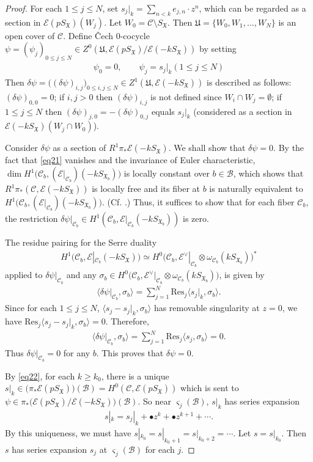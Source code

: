 \documentclass[12pt,a4paper,notitlepage]{article}
\theoremstyle{definition}
\theoremstyle{plain}
\newcommand{\fk}{\mathfrak}
\newcommand{\mc}{\mathcal}
\newcommand{\Res}{\mathrm{Res}}
\newcommand{\bk}[1]{\langle {#1}\rangle}
\newcommand{\scr}{\mathscr}
\newcommand{\sgm}{\varsigma}
\newcommand{\SX}{{S_{\fk X}}}
\numberwithin{equation}{section}
\begin{document}
\begin{proof}
For each $1\leq j\leq N$, set $s_j|_k=\sum_{n<k}e_{j,n}\cdot z^n$, which can be regarded as a section in $\scr E(p\SX)(W_j)$. Let $W_0=\mc C\setminus\SX$. Then $\fk U=\{W_0,W_1,\dots,W_N \}$ is an open cover of $\mc C$. Define \v{C}ech $0$-cocycle $\psi=(\psi_j)_{0\leq j\leq N}\in Z^0(\fk U,\scr E(p\SX)/\scr E(-k\SX))$ by setting
\begin{align*}
\psi_0=0,\qquad\psi_j=s_j|_k (1\leq j\leq N)
\end{align*}
Then $\delta\psi=\big((\delta\psi)_{i,j}\big)_{0\leq i,j\leq N}\in Z^1(\fk U,\scr E(-k\SX))$ is described as follows: $(\delta\psi)_{0,0}=0$; if $i,j>0$ then $(\delta\psi)_{i,j}$ is not defined since $W_i\cap W_j=\emptyset$; if $1\leq j\leq N$ then $(\delta\psi)_{j,0}=-(\delta\psi)_{0,j}$ equals $s_j|_k$ (considered as a section in $\scr E(-k\SX)(W_j\cap W_0)$).
	
Consider $\delta\psi$ as a section of $R^1\pi_*\scr E(-k\SX)$. We shall show that $\delta\psi=0$.  By the fact that \eqref{eq21} vanishes and the invariance of Euler characteristic,  $\dim H^1\big(\mc C_b,(\scr E|_{\mc C_b})(-kS_{\fk X_b})\big)$ is locally constant over $b\in\mc B$, which shows  that $R^1\pi_*(\mc C,\scr E(-k\SX))$ is locally free and its fiber at $b$ is naturally equivalent to $H^1\big(\mc C_b,(\scr E|_{\mc C_b})(-kS_{\fk X_b})\big)$. (Cf. \cite[Thm. III.4.12]{BS76}.) Thus, it suffices to show that for each fiber $\mc C_b$, the restriction $\delta\psi|_{\mc C_b}\in H^1(\mc C_b,\scr E|_{\mc C_b}(-k S_{\fk X_b}))$ is zero.

The residue pairing for the Serre duality
\begin{align*}
H^1(\mc C_b,\scr E|_{\mc C_b}(-k\SX))\simeq H^0\big(\mc C_b,\scr E^\vee|_{\mc C_b}\otimes\omega_{\mc C_b}(kS_{\fk X_b})\big)^*
\end{align*}
applied to $\delta\psi|_{\mc C_b}$ and any $\sigma_b\in H^0\big(\mc C_b,\scr E^\vee|_{\mc C_b}\otimes\omega_{\mc C_b}(kS_{\fk X_b})\big)$, is given by
\begin{align*}
\bk{\delta\psi|_{\mc C_b},\sigma_b}=\sum_{j=1}^N\Res_j\bk{s_j|_k,\sigma_b}.
\end{align*}
Since for each $1\leq j\leq N$, $\bk{s_j-s_j|_k,\sigma_b}$ has removable singularity at $z=0$, we have $\Res_j\bk{s_j-s_j|_k,\sigma_b}=0$. Therefore, 
\begin{align*}
\bk{\delta\psi|_{\mc C_b},\sigma_b}=\sum_{j=1}^N\Res_j\bk{s_j,\sigma_b}=0.
\end{align*}
Thus $\delta\psi|_{\mc C_b}=0$ for any $b$.  This proves that $\delta\psi=0$. 
	
By \eqref{eq22}, for each $k\geq k_0$, there is a unique $s|_k\in\big(\pi_*\scr E(p\SX)\big)(\mc B)= H^0(\mc C,\scr E(p\SX))$ which is sent to $\psi\in \pi_*\big(\scr E(p\SX)/\scr E(-k\SX)\big)(\mc B)$. So near $\sgm_j(\mc B)$, $s|_k$ has series expansion
\begin{align}
s|_k=s_j|_k+\bullet z^k+\bullet z^{k+1}+\cdots.\label{eq23}
\end{align}
By this uniqueness, we must have $s|_{k_0}=s|_{k_0+1}=s|_{k_0+2}=\cdots$. Let $s=s|_{k_0}$. Then $s$ has series expansion $s_j$ at $\sgm_j(\mc B)$ for each $j$.
\end{proof}
\end{document}
